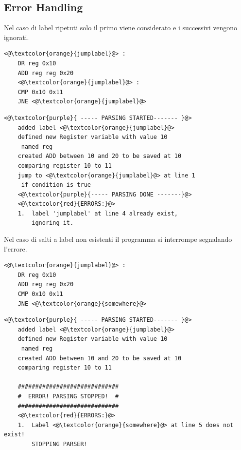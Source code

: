 \newpage
\subsection{Error Handling}
Nel caso di label ripetuti solo il primo viene considerato e i successivi vengono ignorati.
\begin{lstlisting}[caption=input]
    <@\textcolor{orange}{jumplabel}@> :
    DR reg 0x10
    ADD reg reg 0x20
    <@\textcolor{orange}{jumplabel}@> :
    CMP 0x10 0x11
    JNE <@\textcolor{orange}{jumplabel}@>
\end{lstlisting}
\begin{lstlisting}[caption=output]
    <@\textcolor{purple}{ ----- PARSING STARTED------- }@>
    added label <@\textcolor{orange}{jumplabel}@>
    defined new Register variable with value 10 
     named reg
    created ADD between 10 and 20 to be saved at 10
    comparing register 10 to 11
    jump to <@\textcolor{orange}{jumplabel}@> at line 1
     if condition is true
    <@\textcolor{purple}{----- PARSING DONE -------}@>
    <@\textcolor{red}{ERRORS:}@>
    1.	label 'jumplabel' at line 4 already exist, 
        ignoring it.
\end{lstlisting}
Nel caso di salti a label non esistenti il programma si interrompe segnalando l'errore.
\begin{lstlisting}[caption=input]
    <@\textcolor{orange}{jumplabel}@> :
    DR reg 0x10
    ADD reg reg 0x20
    CMP 0x10 0x11
    JNE <@\textcolor{orange}{somewhere}@>
\end{lstlisting}
\begin{lstlisting}[caption=output]
    <@\textcolor{purple}{ ----- PARSING STARTED------- }@>
    added label <@\textcolor{orange}{jumplabel}@>
    defined new Register variable with value 10 
     named reg
    created ADD between 10 and 20 to be saved at 10
    comparing register 10 to 11
    
    #############################
    #  ERROR! PARSING STOPPED!  #
    #############################
    <@\textcolor{red}{ERRORS:}@>
    1.	Label <@\textcolor{orange}{somewhere}@> at line 5 does not exist! 
        STOPPING PARSER!
\end{lstlisting}
\newpage
